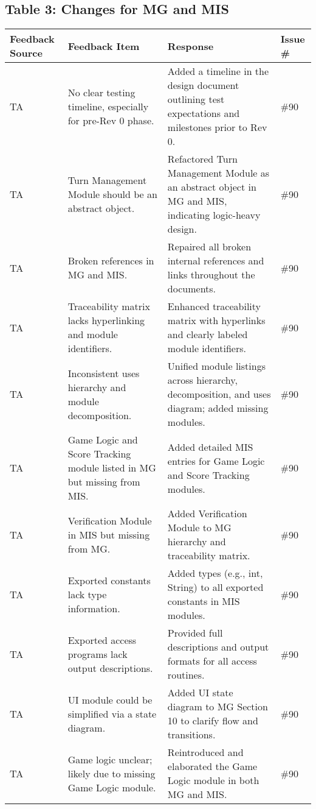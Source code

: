 \documentclass{article}
\begin{document}
\subsection*{Table 3: Changes for MG and MIS}
\begin{longtable}{|p{2cm}|p{5cm}|p{5cm}|p{2cm}|}
\hline
\textbf{Feedback Source} & \textbf{Feedback Item} & \textbf{Response} & \textbf{Issue \#} \\
\hline
TA & No clear testing timeline, especially for pre-Rev 0 phase. & Added a timeline in the design document outlining test expectations and milestones prior to Rev 0. & \#90 \\
\hline
TA & Turn Management Module should be an abstract object. & Refactored Turn Management Module as an abstract object in MG and MIS, indicating logic-heavy design. & \#90 \\
\hline
TA & Broken references in MG and MIS. & Repaired all broken internal references and links throughout the documents. & \#90 \\
\hline
TA & Traceability matrix lacks hyperlinking and module identifiers. & Enhanced traceability matrix with hyperlinks and clearly labeled module identifiers. & \#90 \\
\hline
TA & Inconsistent uses hierarchy and module decomposition. & Unified module listings across hierarchy, decomposition, and uses diagram; added missing modules. & \#90 \\
\hline
TA & Game Logic and Score Tracking module listed in MG but missing from MIS. & Added detailed MIS entries for Game Logic and Score Tracking modules. & \#90 \\
\hline
TA & Verification Module in MIS but missing from MG. & Added Verification Module to MG hierarchy and traceability matrix. & \#90 \\
\hline
TA & Exported constants lack type information. & Added types (e.g., int, String) to all exported constants in MIS modules. & \#90 \\
\hline
TA & Exported access programs lack output descriptions. & Provided full descriptions and output formats for all access routines. & \#90 \\
\hline
TA & UI module could be simplified via a state diagram. & Added UI state diagram to MG Section 10 to clarify flow and transitions. & \#90 \\
\hline
TA & Game logic unclear; likely due to missing Game Logic module. & Reintroduced and elaborated the Game Logic module in both MG and MIS. & \#90 \\

\end{longtable}
\end{document}
